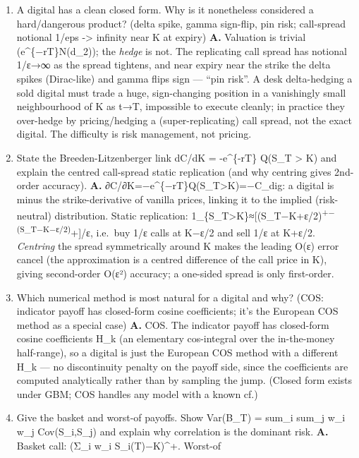 \documentclass[
  11pt,
]{article}
\begin{document}
\begin{enumerate}
  vanilla = asset-or-nothing − K·cash-or-nothing.
\item
  A digital has a clean closed form. Why is it nonetheless considered a
  hard/dangerous product? (delta spike, gamma sign-flip, pin risk;
  call-spread notional 1/eps -\textgreater{} infinity near K at expiry)
  \textbf{A.} Valuation is trivial (e\^{}\{−rT\}N(d\_2)); the
  \emph{hedge} is not. The replicating call spread has notional 1/ε→∞ as
  the spread tightens, and near expiry near the strike the delta spikes
  (Dirac-like) and gamma flips sign --- ``pin risk''. A desk
  delta-hedging a sold digital must trade a huge, sign-changing position
  in a vanishingly small neighbourhood of K as t→T, impossible to
  execute cleanly; in practice they over-hedge by pricing/hedging a
  (super-replicating) call spread, not the exact digital. The difficulty
  is risk management, not pricing.
\item
  State the Breeden-Litzenberger link dC/dK = -e\^{}\{-rT\} Q(S\_T
  \textgreater{} K) and explain the centred call-spread static
  replication (and why centring gives 2nd-order accuracy). \textbf{A.}
  ∂C/∂K=−e\^{}\{−rT\}Q(S\_T\textgreater K)=−C\_dig: a digital is minus
  the strike-derivative of vanilla prices, linking it to the implied
  (risk-neutral) distribution. Static replication:
  1\_\{S\_T\textgreater K\}≈{[}(S\_T−K+ε/2)\textsuperscript{+−(S\_T−K−ε/2)}+{]}/ε,
  i.e.~buy 1/ε calls at K−ε/2 and sell 1/ε at K+ε/2. \emph{Centring} the
  spread symmetrically around K makes the leading O(ε) error cancel (the
  approximation is a centred difference of the call price in K), giving
  second-order O(ε²) accuracy; a one-sided spread is only first-order.
\item
  Which numerical method is most natural for a digital and why? (COS:
  indicator payoff has closed-form cosine coefficients; it's the
  European COS method as a special case) \textbf{A.} COS. The indicator
  payoff has closed-form cosine coefficients H\_k (an elementary
  cos-integral over the in-the-money half-range), so a digital is just
  the European COS method with a different H\_k --- no discontinuity
  penalty on the payoff side, since the coefficients are computed
  analytically rather than by sampling the jump. (Closed form exists
  under GBM; COS handles any model with a known cf.)
\item
  Give the basket and worst-of payoffs. Show Var(B\_T) = sum\_i sum\_j
  w\_i w\_j Cov(S\_i,S\_j) and explain why correlation is the dominant
  risk. \textbf{A.} Basket call: (Σ\_i w\_i S\_i(T)−K)\^{}+. Worst-of

\end{enumerate}
\end{document}
